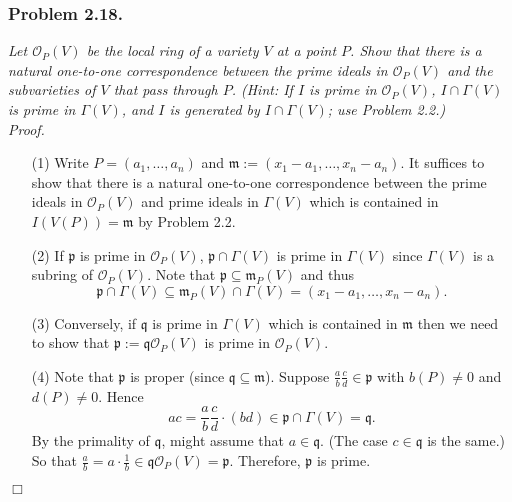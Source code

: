 \documentclass{article}
\begin{document}
\subsubsection*{Problem 2.18.}
\emph{Let $\mathscr{O}_P(V)$ be the local ring of a variety $V$ at a point $P$.
Show that there is a natural one-to-one correspondence between the prime ideals in $\mathscr{O}_P(V)$
and the subvarieties of $V$ that pass through $P$.
(Hint: If $I$ is prime in $\mathscr{O}_P(V)$,
$I \cap \Gamma(V)$ is prime in $\Gamma(V)$,
and $I$ is generated by $I \cap \Gamma(V)$; use Problem 2.2.)} \\



\emph{Proof.}
\begin{enumerate}
\item[(1)]
  Write $P = (a_1, \ldots, a_n)$ and $\mathfrak{m} := (x_1-a_1, \ldots, x_n - a_n)$.
  It suffices to show that
  there is a natural one-to-one correspondence between the prime ideals in $\mathscr{O}_P(V)$
  and prime ideals in $\Gamma(V)$ which is contained in $I(V(P)) = \mathfrak{m}$
  by Problem 2.2.

\item[(2)]
  If $\mathfrak{p}$ is prime in $\mathscr{O}_P(V)$,
  $\mathfrak{p} \cap \Gamma(V)$ is prime in $\Gamma(V)$
  since $\Gamma(V)$ is a subring of $\mathscr{O}_P(V)$.
  Note that $\mathfrak{p} \subseteq \mathfrak{m}_P(V)$
  and thus
  \[
    \mathfrak{p} \cap \Gamma(V)
    \subseteq \mathfrak{m}_P(V) \cap \Gamma(V)
    = (x_1-a_1, \ldots, x_n - a_n).
  \]

\item[(3)]
  Conversely,
  if $\mathfrak{q}$ is prime in $\Gamma(V)$ which is contained in
  $\mathfrak{m}$
  then we need to show that
  $\mathfrak{p} := \mathfrak{q}\mathscr{O}_P(V)$ is prime in $\mathscr{O}_P(V)$.

\item[(4)]
  Note that $\mathfrak{p}$ is proper
  (since $\mathfrak{q} \subseteq \mathfrak{m}$).
  Suppose $\frac{a}{b} \frac{c}{d} \in \mathfrak{p}$ with $b(P) \neq 0$ and $d(P) \neq 0$.
  Hence
  \[
    ac = \frac{a}{b} \frac{c}{d} \cdot (bd)
    \in \mathfrak{p} \cap \Gamma(V)
    = \mathfrak{q}.
  \]
  By the primality of $\mathfrak{q}$, might assume that $a \in \mathfrak{q}$.
  (The case $c \in \mathfrak{q}$ is the same.)
  So that $\frac{a}{b} = a \cdot \frac{1}{b} \in \mathfrak{q}\mathscr{O}_P(V) = \mathfrak{p}$.
  Therefore,
  $\mathfrak{p}$ is prime.
\end{enumerate}
$\Box$ \\\\
\end{document}
